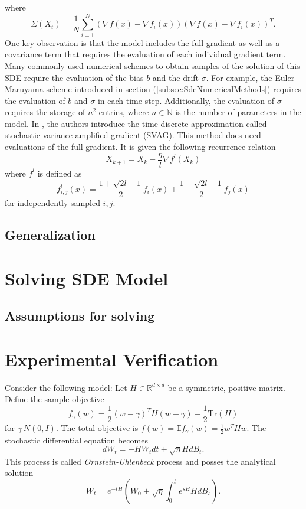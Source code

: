 \documentclass[12pt]{article}
\theoremstyle{definition}
\numberwithin{equation}{section}
\begin{document}
where
\begin{equation}
  \Sigma(X_t) = \frac{1}{N} \sum_{i=1}^N (\nabla f(x) - \nabla f_i(x))(\nabla f(x) - \nabla f_i(x))^T.
\end{equation}
One key observation is that the model includes the full gradient as well as a covariance term that requires the evaluation of each individual gradient term. Many commonly used numerical schemes  to obtain samples of the solution of this SDE require the evaluation of the bias $b$ and the drift $\sigma$. For example, the Euler-Maruyama scheme introduced in section (\ref{subsec:SdeNumericalMethods}) requires the evaluation of $b$ and $\sigma$ in each time step. 
Additionally, the evaluation of $\sigma$ requires the storage of $n^2$ entries, where $n \in \mathbb{N}$ is the number of parameters in the model.
In \autocite{liValidityModelingSGD2021}, the authors introduce the time discrete approximation called stochastic variance amplified gradient (SVAG). This method does need evaluations of the full gradient. It is given the following recurrence relation
\begin{equation}
  X_{k+1} = X_k - \frac{\eta}{l} \nabla f^l(X_k)
\end{equation}
where $f^l$ is defined as
\begin{equation}
  f^l_{i,j}(x) = \frac{1+\sqrt{2l - 1}}{2}f_i(x) + \frac{1-\sqrt{2l - 1}}{2}f_j(x)
\end{equation}
for independently sampled $i,j$.
\subsection{Generalization}
\section{Solving SDE Model}
\label{sec:SolvingSDEModel}
\subsection{Assumptions for solving}
\section{Experimental Verification} 
\label{sec:ExperimentalVerification}
Consider the following model: Let $H \in \mathbb{R}^{d\times d}$ be a symmetric, positive matrix. Define the sample objective 
\begin{equation}
  f_{\gamma}(w) = \frac{1}{2} (w - \gamma)^T H (w - \gamma) - \frac{1}{2} \text{Tr}(H)
\end{equation}
for $\gamma ~ N(0,I)$. The total objective is $f(w) = \mathbb{E} f_{\gamma}(w) = \frac{1}{2} w^T H w$.
The stochastic differential equation becomes 
\begin{equation}
  dW_t = -H W_t dt + \sqrt{\eta}H dB_t.
\end{equation}
This process is called \emph{Ornstein-Uhlenbeck} \autocite{uhlenbeckTheoryBrownianMotion1930} process and posses the analytical solution
\begin{equation}
  W_t = e^{-t H}(W_0 + \sqrt{\eta}\int_0^te^{s H}H dB_s).
\end{equation}
\end{document}
